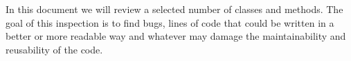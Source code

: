 In this document we will review a selected number of classes and methods.
The goal of this inspection is to find bugs, lines of code that could be written
in a better or more readable way and whatever may damage the maintainability and reusability of the code.